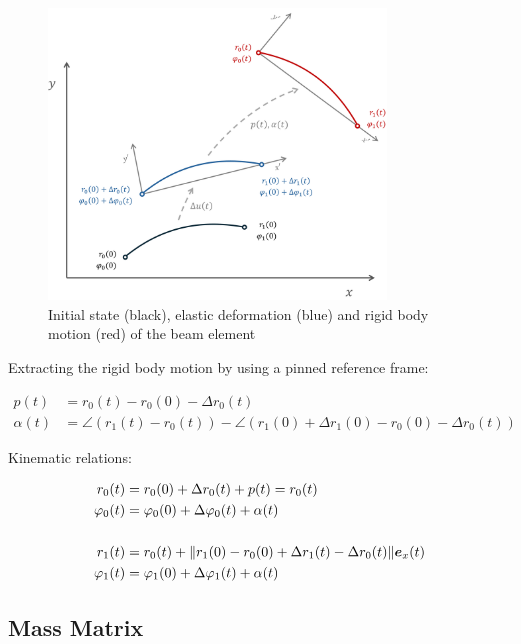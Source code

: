 \begin{figure}[h]
\centering
\includegraphics[width=0.8\textwidth]{figures/elements/beam-element-corotational.pdf}
\caption{Initial state (black), elastic deformation (blue) and rigid body motion (red) of the beam element}
\label{fig:beam-element-corotatrional}
\end{figure}

Extracting the rigid body motion by using a pinned reference frame:

\begin{align}
p(t) &= r_{0}(t) - r_{0}(0) - \Delta r_0(t) \\
\alpha(t) &= \angle\left(r_1(t) - r_0(t)\right) - \angle\left(r_1(0) + \Delta r_1(0) - r_0(0) - \Delta r_0(t)\right)
\end{align}

Kinematic relations:

\begin{align}
r_0(t) &= r_0(0) + \Delta r_0(t) + p(t) = r_0(t) \\
\varphi_0(t) &= \varphi_0(0) + \Delta\varphi_0(t) + \alpha(t) \\
\notag \\
r_1(t) &= r_0(t) + \lVert r_1(0) - r_0(0) + \Delta r_1(t) - \Delta r_0(t) \rVert\boldsymbol{e}_x(t) \\
\varphi_1(t) &= \varphi_1(0) + \Delta\varphi_1(t) + \alpha(t)
\end{align}

\newpage
\subsection{Mass Matrix}


